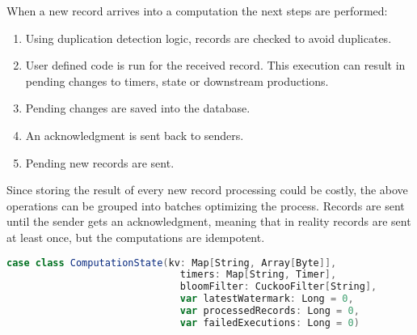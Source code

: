 \noindent
When a new record arrives into a computation the next steps are
performed:
%
\begin{enumerate}
  \item Using duplication detection logic, records are checked to avoid duplicates.
  \item User defined code is run for the received record. This execution can
    result in pending changes to timers, state or downstream productions.
  \item Pending changes are saved into the database.
  \item An acknowledgment is sent back to senders.
  \item Pending new records are sent.
\end{enumerate}

Since storing the result of every new record processing could be costly, the
above operations can be grouped into batches optimizing the process. Records are
sent until the sender gets an acknowledgment, meaning that in reality records
are sent at least once, but the computations are idempotent.

\begin{lstlisting}[language=scala, frame=trBL, label=code:computationState, float=ht, caption = {Alcaudon internal computation state}]
case class ComputationState(kv: Map[String, Array[Byte]],
                              timers: Map[String, Timer],
                              bloomFilter: CuckooFilter[String],
                              var latestWatermark: Long = 0,
                              var processedRecords: Long = 0,
                              var failedExecutions: Long = 0)
\end{lstlisting}

